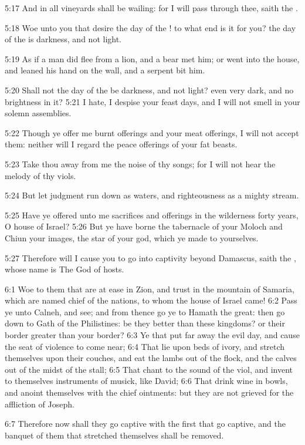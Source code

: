 5:17 And in all vineyards shall be wailing: for I will pass through
thee, saith the \LORD.

5:18 Woe unto you that desire the day of the \LORD! to what end is it
for you? the day of the \LORD is darkness, and not light.

5:19 As if a man did flee from a lion, and a bear met him; or went
into the house, and leaned his hand on the wall, and a serpent bit
him.

5:20 Shall not the day of the \LORD be darkness, and not light? even
very dark, and no brightness in it?  5:21 I hate, I despise your feast
days, and I will not smell in your solemn assemblies.

5:22 Though ye offer me burnt offerings and your meat offerings, I
will not accept them: neither will I regard the peace offerings of
your fat beasts.

5:23 Take thou away from me the noise of thy songs; for I will not
hear the melody of thy viols.

5:24 But let judgment run down as waters, and righteousness as a
mighty stream.

5:25 Have ye offered unto me sacrifices and offerings in the
wilderness forty years, O house of Israel?  5:26 But ye have borne the
tabernacle of your Moloch and Chiun your images, the star of your god,
which ye made to yourselves.

5:27 Therefore will I cause you to go into captivity beyond Damascus,
saith the \LORD, whose name is The God of hosts.

6:1 Woe to them that are at ease in Zion, and trust in the mountain of
Samaria, which are named chief of the nations, to whom the house of
Israel came!  6:2 Pass ye unto Calneh, and see; and from thence go ye
to Hamath the great: then go down to Gath of the Philistines: be they
better than these kingdoms? or their border greater than your border?
6:3 Ye that put far away the evil day, and cause the seat of violence
to come near; 6:4 That lie upon beds of ivory, and stretch themselves
upon their couches, and eat the lambs out of the flock, and the calves
out of the midst of the stall; 6:5 That chant to the sound of the
viol, and invent to themselves instruments of musick, like David; 6:6
That drink wine in bowls, and anoint themselves with the chief
ointments: but they are not grieved for the affliction of Joseph.

6:7 Therefore now shall they go captive with the first that go
captive, and the banquet of them that stretched themselves shall be
removed.

